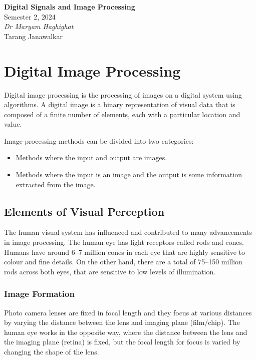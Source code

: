 \documentclass{article}
\date{}
\newcommand{\unitName}{Digital Signals and Image Processing}
\newcommand{\unitTime}{Semester 2, 2024}
\newcommand{\unitCoordinator}{Dr Maryam Haghighat}
\newcommand{\documentAuthors}{Tarang Janawalkar}
\begin{document}
%
\begin{titlepage}
    \vspace*{\fill}
    \begin{center}
        \LARGE{\textbf{\unitName}} \\[0.1in]
        \normalsize{\unitTime} \\[0.2in]
        \normalsize\textit{\unitCoordinator} \\[0.2in]
        \documentAuthors
    \end{center}
    \vspace*{\fill}
    \doclicenseThis
    \thispagestyle{empty}
\end{titlepage}
\newpage
%
\tableofcontents
\newpage
%
\section{Digital Image Processing}
Digital image processing is the processing of images on a digital
system using algorithms. A digital image is a binary representation of
visual data that is composed of a finite number of elements, each with
a particular location and value.

Image processing methods can be divided into two categories:
\begin{itemize}
    \item Methods where the input and output are images.
    \item Methods where the input is an image and the output is some
          information extracted from the image.
\end{itemize}
\subsection{Elements of Visual Perception}
The human visual system has influenced and contributed to many
advancements in image processing. The human eye has light receptors
called rods and cones. Humans have around \numrange{6}{7} million cones
in each eye that are highly sensitive to colour and fine details. On
the other hand, there are a total of \numrange{75}{150} million rods
across both eyes, that are sensitive to low levels of illumination.
\subsubsection{Image Formation}
Photo camera lenses are fixed in focal length and they focus at various
distances by varying the distance between the lens and imaging plane
(film/chip). The human eye works in the opposite way, where the
distance between the lens and the imaging plane (retina) is fixed, but
the focal length for focus is varied by changing the shape of the lens.
\end{document}
